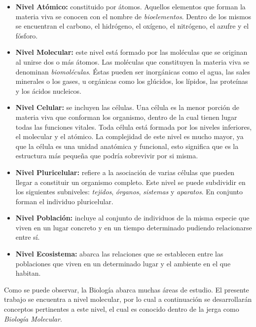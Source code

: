 \begin{itemize}
	\item \textbf{Nivel Atómico:} constituido por átomos. Aquellos elementos
			que forman la materia viva se conocen con el nombre
			de \emph{bioelementos}. Dentro de los mismos se encuentran 
			el carbono, el hidrógeno, el oxígeno, el nitrógeno, el
			azufre y el fósforo.

	\item \textbf{Nivel Molecular:} este nivel está formado por las
			moléculas que se originan al unirse dos o más átomos.
			Las moléculas que constituyen la materia viva se
			denominan \emph{biomoléculas}. Éstas pueden ser
			inorgánicas como el agua, las sales minerales o los
			gases, u orgánicas como los glúcidos, los lípidos, las
			proteínas y los ácidos nucleicos.

	\item \textbf{Nivel Celular:} se incluyen las células. Una célula
			es la menor porción de materia viva que conforman los organismo, dentro de 
			la cual tienen lugar todas las funciones vitales. Toda célula está
			formada por los niveles inferiores, el molecular y el
			atómico. La complejidad de este nivel es mucho mayor,
			ya que la célula es una unidad anatómica y funcional,
			esto significa que es la estructura más pequeña que
			podría sobrevivir por si misma.

	\item \textbf{Nivel Pluricelular:} refiere a la asociación de varias
			células que pueden llegar a constituir un organismo
			completo. Este nivel se puede subdividir en los
			siguientes subniveles: \emph{tejidos}, \emph{órganos}, \emph{sistemas} y \emph{aparatos}.  
            En conjunto forman el individuo pluricelular.

	\item \textbf{Nivel Población:} incluye al conjunto de individuos de
			la misma especie que viven en un lugar concreto y en
			un tiempo determinado pudiendo relacionarse entre sí.

	\item \textbf{Nivel Ecosistema:} abarca las relaciones que se
			establecen entre las poblaciones que viven en un
			determinado lugar y el ambiente en el que habitan. 
\end{itemize}

\par Como se puede observar, la Biología abarca muchas áreas de estudio. El presente trabajo se encuentra a nivel molecular, por lo cual a continuación se desarrollarán conceptos pertinentes a este nivel, el cual es conocido dentro de la jerga como \textit{Biología Molecular}.


